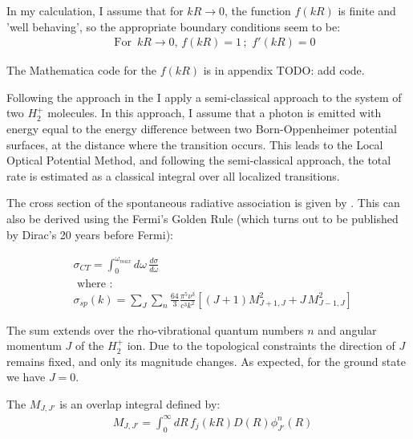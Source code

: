 In my calculation, I assume that  for $ kR \rightarrow 0 $, the function $  f(kR) $ is finite and 'well  behaving', so the appropriate boundary conditions seem to be: 
\begin{equation}
\begin{split}
& \text{ For }\,kR \rightarrow 0,\,f(kR) = 1\,;\,\,f'(kR)  = 0
\end{split}
\end{equation}

The Mathematica code for the $  f(kR) $ is in appendix TODO: add code.

Following the approach in the \cite{ZL} I apply a semi-classical approach to the system of two $ H_2^{+} $ molecules. In this approach, I assume that a photon is emitted with energy equal to the energy difference between two Born-Oppenheimer potential surfaces, at the distance where the transition occurs. This leads to the Local Optical Potential Method, and following the semi-classical approach, the total rate is estimated as a classical integral over all localized transitions. 

The cross section of the spontaneous radiative association is given by \cite{Zygelman1} .  This can also be derived 
using the Fermi's Golden Rule (which turns out to be published by Dirac's 20 years before Fermi):

\begin{equation}
\begin{split}
& \sigma_{CT}  = \int_0^{\omega_{max}}{d\omega\,\frac{d\sigma}{d\omega}} \\[.8em]
& \text{ where }: \\[.8em]
& \sigma_{sp}(k) = \sum_J\sum_n{\frac{64}{3}\frac{\pi^5\nu^3}{c^3k^2}\left[(J+1)M_{J+1,J}^2 + J\,M_{J-1,J}^2 \right] }
\end{split}
\end{equation}

The sum extends over the rho-vibrational quantum numbers $ n $ and angular momentum $ J $ of the $ H_2^{+} $ ion. Due to the topological constraints the direction of $ J $ remains fixed, and only its magnitude changes. As expected, for the ground state we have $ J = 0 $. 

The $ M_{J,J'}  $ is an overlap integral defined by:
\begin{equation}
\begin{split}
& M_{J,J'} = \int_0^{\infty}{dR\,f_j(kR)D(R)\phi_{J'}^n(R)}
\end{split}
\end{equation}

